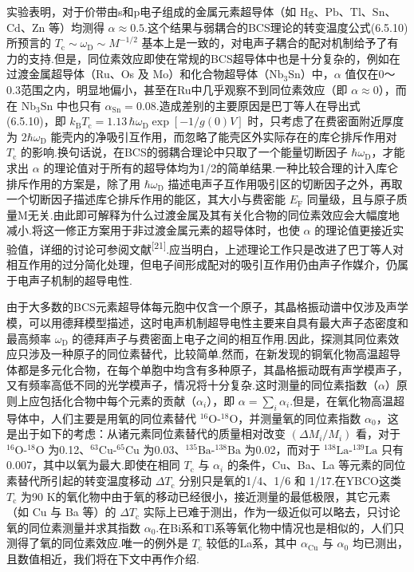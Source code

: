 实验表明，对于价带由s和p电子组成的金属元素超导体（如 $\mathrm{Hg}$、$\mathrm{Pb}$、$\mathrm{Tl}$、$\mathrm{Sn}$、$\mathrm{Cd}$、$\mathrm{Zn}$ 等）均测得 $\alpha\approx0.5$.这个结果与弱耦合的BCS理论的转变温度公式(6.5.10)所预言的 $T_{\mathrm{c}}\sim\omega_{\mathrm{D}}\sim M^{-1/2}$ 基本上是一致的，对电声子耦合的配对机制给予了有力的支持.但是，同位素效应即使在常规的BCS超导体中也是十分复杂的，例如在过渡金属超导体（Ru、Os 及 Mo）和化合物超导体（$\mathrm{Nb}_{3}\mathrm{Sn}$）中，$\alpha$ 值仅在0～0.3范围之内，明显地偏小，甚至在Ru中几乎观察不到同位素效应（即 $\alpha\approx0$），而在 $\mathrm{Nb}_{3}\mathrm{Sn}$ 中也只有 $\alpha_{\mathrm{Sn}}=0.08$.造成差别的主要原因是巴丁等人在导出式(6.5.10)，即 $k_{\mathrm{B}}T_{\mathrm{c}}=1.13\,\hbar\omega_{\mathrm{D}}\exp\left[-1/g(0)V\right]$ 时，只考虑了在费密面附近厚度为 $2\hbar\omega_{\mathrm{D}}$ 能壳内的净吸引互作用，而忽略了能壳区外实际存在的库仑排斥作用对 $T_{\mathrm{c}}$ 的影响.换句话说，在BCS的弱耦合理论中只取了一个能量切断因子 $\hbar\omega_{\mathrm{D}}$，才能求出 $\alpha$ 的理论值对于所有的超导体均为1/2的简单结果.一种比较合理的计入库仑排斥作用的方案是，除了用 $\hbar\omega_{\mathrm{D}}$ 描述电声子互作用吸引区的切断因子之外，再取一个切断因子描述库仑排斥作用的能区，其大小与费密能 $E_{\mathrm{F}}$ 同量级，且与原子质量M无关.由此即可解释为什么过渡金属及其有关化合物的同位素效应会大幅度地减小.将这一修正方案用于非过渡金属元素的超导体时，也使 $\alpha$ 的理论值更接近实验值，详细的讨论可参阅文献\textsuperscript{[21]}.应当明白，上述理论工作只是改进了巴丁等人对相互作用的过分简化处理，但电子间形成配对的吸引互作用仍由声子作媒介，仍属于电声子机制的超导电性.

由于大多数的BCS元素超导体每元胞中仅含一个原子，其晶格振动谱中仅涉及声学模，可以用德拜模型描述，这时电声机制超导电性主要来自具有最大声子态密度和最高频率 $\omega_{\mathrm{D}}$ 的德拜声子与费密面上电子之间的相互作用.因此，探测其同位素效应只涉及一种原子的同位素替代，比较简单.然而，在新发现的铜氧化物高温超导体都是多元化合物，在每个单胞中均含有多种原子，其晶格振动既有声学模声子，又有频率高低不同的光学模声子，情况将十分复杂.这时测量的同位素指数（$\alpha$）原则上应包括化合物中每个元素的贡献（$\alpha_{i}$），即 $\alpha=\sum_{i}\alpha_{i}$.但是，在氧化物高温超导体中，人们主要是用氧的同位素替代 $^{16}\mathrm{O}$-$^{18}\mathrm{O}$，并测量氧的同位素指数 $\alpha_{0}$，这是出于如下的考虑：从诸元素同位素替代的质量相对改变 $\left(\Delta M_{i}/M_{i}\right)$ 看，对于 $^{16}\mathrm{O}$-$^{18}\mathrm{O}$ 为0.12、$^{63}\mathrm{Cu}$-$^{65}\mathrm{Cu}$ 为0.03、$^{135}\mathrm{Ba}$-$^{138}\mathrm{Ba}$ 为0.02，而对于 $^{138}\mathrm{La}$-$^{139}\mathrm{La}$ 只有0.007，其中以氧为最大.即使在相同 $T_{\mathrm{c}}$ 与 $\alpha_{i}$ 的条件，Cu、Ba、La 等元素的同位素替代所引起的转变温度移动 $\Delta T_{\mathrm{c}}$ 分别只是氧的1/4、1/6 和 1/17.在YBCO这类 $T_{\mathrm{c}}$ 为90 K的氧化物中由于氧的移动已经很小，接近测量的最低极限，其它元素（如 Cu 与 Ba 等）的 $\Delta T_{\mathrm{c}}$ 实际上已难于测出，作为一级近似可以略去，只讨论氧的同位素测量并求其指数 $\alpha_{0}$.在Bi系和Tl系等氧化物中情况也是相似的，人们只测得了氧的同位素效应.唯一的例外是 $T_{\mathrm{c}}$ 较低的La系，其中 $\alpha_{\mathrm{Cu}}$ 与 $\alpha_{0}$ 均已测出，且数值相近，我们将在下文中再作介绍.

